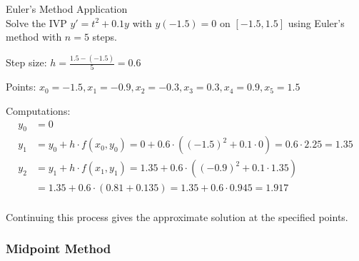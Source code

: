 \begin{example2}{Euler's Method Application}\\
Solve the IVP $y' = t^2 + 0.1y$ with $y(-1.5) = 0$ on $[-1.5, 1.5]$ using Euler's method with $n = 5$ steps.

Step size: $h = \frac{1.5-(-1.5)}{5} = 0.6$

Points: $x_0 = -1.5, x_1 = -0.9, x_2 = -0.3, x_3 = 0.3, x_4 = 0.9, x_5 = 1.5$

Computations:
\begin{align*}
y_0 &= 0\\
y_1 &= y_0 + h \cdot f(x_0, y_0) = 0 + 0.6 \cdot ((-1.5)^2 + 0.1 \cdot 0) = 0.6 \cdot 2.25 = 1.35\\
y_2 &= y_1 + h \cdot f(x_1, y_1) = 1.35 + 0.6 \cdot ((-0.9)^2 + 0.1 \cdot 1.35)\\
&= 1.35 + 0.6 \cdot (0.81 + 0.135) = 1.35 + 0.6 \cdot 0.945 = 1.917\\
\end{align*}

Continuing this process gives the approximate solution at the specified points.
\end{example2}

\subsubsection{Midpoint Method}

